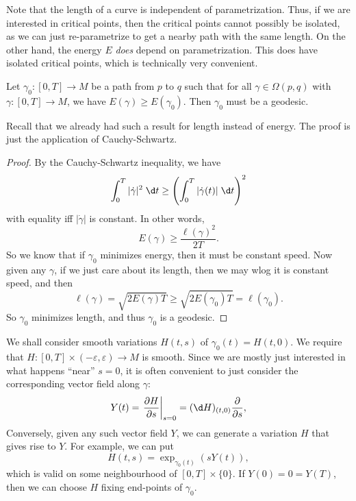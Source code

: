 \documentclass[a4paper]{article}
\begin{document}
Note that the length of a curve is independent of parametrization. Thus, if we are interested in critical points, then the critical points cannot possibly be isolated, as we can just re-parametrize to get a nearby path with the same length. On the other hand, the energy $E$ \emph{does} depend on parametrization. This does have isolated critical points, which is technically very convenient.

\begin{prop}
  Let $\gamma_0: [0, T] \to M$ be a path from $p$ to $q$ such that for all $\gamma \in \Omega(p, q)$ with $\gamma:[0, T] \to M$, we have $E(\gamma) \geq E(\gamma_0)$. Then $\gamma_0$ must be a geodesic.
\end{prop}

Recall that we already had such a result for length instead of energy. The proof is just the application of Cauchy-Schwartz.

\begin{proof}
  By the Cauchy-Schwartz inequality, we have
  \[
    \int_0^T |\dot{\gamma}|^2\; \d t \geq \left(\int_0^T |\dot{\gamma}(t)|\;\d t\right)^2
  \]
  with equality iff $|\dot{\gamma}|$ is constant. In other words,
  \[
    E(\gamma) \geq \frac{\ell(\gamma)^2}{2T}.
  \]
  So we know that if $\gamma_0$ minimizes energy, then it must be constant speed. Now given any $\gamma$, if we just care about its length, then we may wlog it is constant speed, and then
  \[
    \ell(\gamma) = \sqrt{2E(\gamma)T }\geq \sqrt{2 E(\gamma_0)T} = \ell(\gamma_0).
  \]
  So $\gamma_0$ minimizes length, and thus $\gamma_0$ is a geodesic.
\end{proof}

We shall consider smooth variations $H(t, s)$ of $\gamma_0(t) = H(t, 0)$. We require that $H: [0, T] \times (-\varepsilon, \varepsilon) \to M$ is smooth. Since we are mostly just interested in what happens ``near'' $s = 0$, it is often convenient to just consider the corresponding vector field along $\gamma$:
\[
  Y(t) = \left.\frac{\partial H}{\partial s}\right|_{s = 0} = (\d H)_{(t, 0)} \frac{\partial}{\partial s},
\]
Conversely, given any such vector field $Y$, we can generate a variation $H$ that gives rise to $Y$. For example, we can put
\[
  H(t, s) = \exp_{\gamma_0(t)} (sY(t)),
\]
which is valid on some neighbourhood of $[0, T] \times \{0\}$. If $Y(0) = 0 = Y(T)$, then we can choose $H$ fixing end-points of $\gamma_0$.
\end{document}
